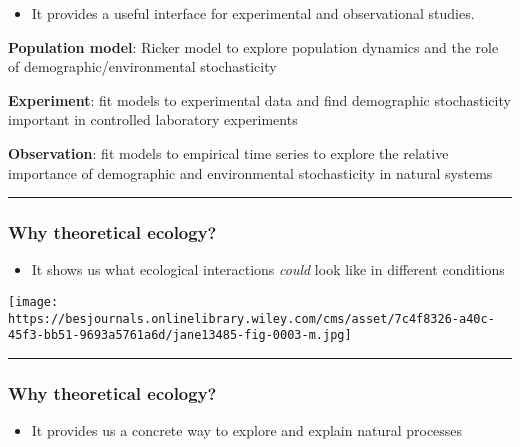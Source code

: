 \documentclass[
]{article}
\providecommand{\tightlist}{%
  \setlength{\itemsep}{0pt}\setlength{\parskip}{0pt}}
\begin{document}
\begin{itemize}
\tightlist
\item
  It provides a useful interface for experimental and observational
  studies.
\end{itemize}

\textbf{Population model}: Ricker model to explore population dynamics
and the role of demographic/environmental stochasticity

\textbf{Experiment}: fit models to experimental data and find
demographic stochasticity important in controlled laboratory experiments

\textbf{Observation}: fit models to empirical time series to explore the
relative importance of demographic and environmental stochasticity in
natural systems

\begin{center}\rule{0.5\linewidth}{0.5pt}\end{center}

\hypertarget{why-theoretical-ecology-2}{%
\subsubsection{Why theoretical
ecology?}\label{why-theoretical-ecology-2}}

\begin{itemize}
\tightlist
\item
  It shows us what ecological interactions \emph{could} look like in
  different conditions
\end{itemize}

\texttt{[image: https://besjournals.onlinelibrary.wiley.com/cms/asset/7c4f8326-a40c-45f3-bb51-9693a5761a6d/jane13485-fig-0003-m.jpg]}

\begin{center}\rule{0.5\linewidth}{0.5pt}\end{center}

\hypertarget{why-theoretical-ecology-3}{%
\subsubsection{Why theoretical
ecology?}\label{why-theoretical-ecology-3}}

\begin{itemize}
\tightlist
\item
  It provides us a concrete way to explore and explain natural processes
\end{itemize}
\end{document}
